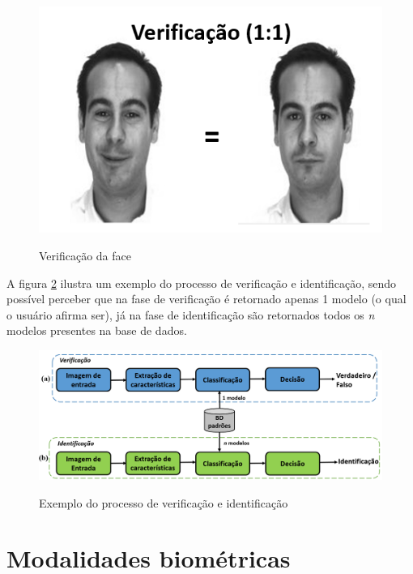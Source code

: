\begin{figure}[H]
\centering
\caption{Verificação da face}
\includegraphics[scale = 0.50]{imgs/1pra1.png}
\label{fig:verificacao}
\end{figure}


A figura \ref{fig:processo_ver_iden} ilustra um exemplo do processo de verificação e identificação, sendo possível perceber que na fase de verificação é retornado apenas 1 modelo (o qual o usuário afirma ser), já na fase de identificação são retornados todos os \textit{n} modelos presentes na base de dados.

\begin{figure}[H]
\centering
\caption{Exemplo do processo de verificação e identificação }
\includegraphics[scale = 0.33]{imgs3/verifi_identi}
\label{fig:processo_ver_iden}
\end{figure}





\section{Modalidades biométricas}



